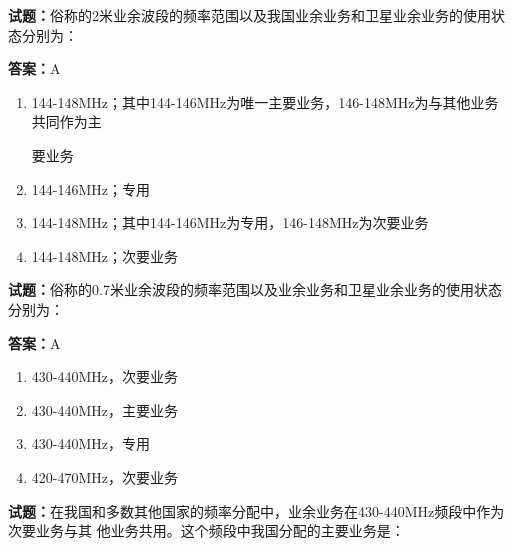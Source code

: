 \documentclass{ctexbook}
\begin{document}




\vspace{1em}

\textbf{试题：}俗称的2米业余波段的频率范围以及我国业余业务和卫星业余业务的使用状态分别为： 

\textbf{答案：}A 

\begin{enumerate}[leftmargin=3em]
  \item 144-148MHz；其中144-146MHz为唯一主要业务，146-148MHz为与其他业务共同作为主


要业务 

  \item 144-146MHz；专用 

  \item 144-148MHz；其中144-146MHz为专用，146-148MHz为次要业务 

  \item 144-148MHz；次要业务 

\end{enumerate}





\vspace{1em}

\textbf{试题：}俗称的0.7米业余波段的频率范围以及业余业务和卫星业余业务的使用状态分别为： 

\textbf{答案：}A 

\begin{enumerate}[leftmargin=3em]
  \item 430-440MHz，次要业务 

  \item 430-440MHz，主要业务 

  \item 430-440MHz，专用 

  \item 420-470MHz，次要业务 

\end{enumerate}





\vspace{1em}

\textbf{试题：}在我国和多数其他国家的频率分配中，业余业务在430-440MHz频段中作为次要业务与其
他业务共用。这个频段中我国分配的主要业务是： 
\end{document}
